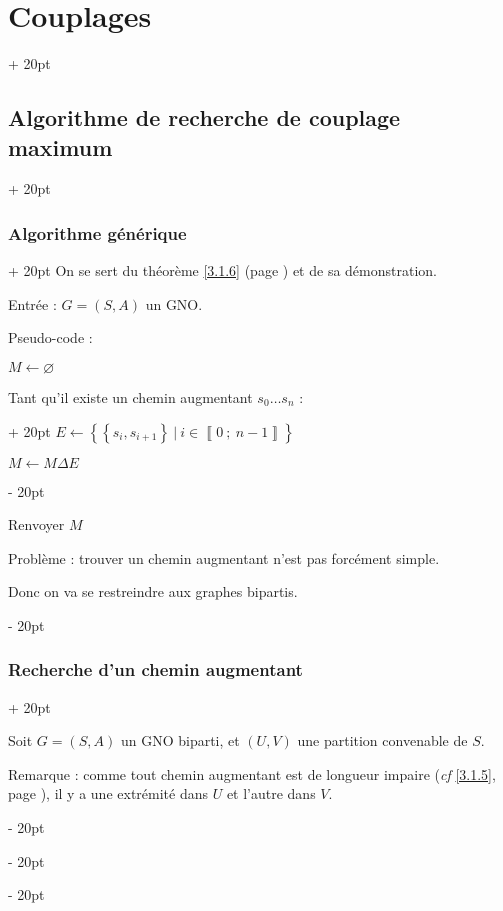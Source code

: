 \documentclass[a4paper, 12pt, twoside]{article}
\newcommand{\nset}[2]{\left\llbracket #1\ ;\ #2 \right\rrbracket}
\newcommand{\set}[1]{\left\{ #1 \right\}}
\newcommand{\ind}[1][20pt]{\advance\leftskip + #1}
\newcommand{\deind}[1][20pt]{\advance\leftskip - #1}
\newenvironment{indt}[2][20pt]{#2 \par \ind[#1]}{\par \deind} %
\begin{document}
\begin{indt}{\section{Couplages}}
        \begin{indt}{\subsection{Algorithme de recherche de couplage maximum}}
            \begin{indt}{\subsubsection{Algorithme générique}}
                On se sert du théorème \ref{3.1.6} (page \pageref{3.1.6}) et de sa démonstration.

                Entrée : $G = (S, A)$ un GNO.

                Pseudo-code :

                \begin{pseudocode}
                    $M \leftarrow \varnothing$

                    \begin{indt}{Tant qu'il existe un chemin augmentant $s_0 \ldots s_n$ :}
                        $E \leftarrow \set{\set{s_i, s_{i + 1}}\ |\ i \in \nset 0 {n - 1}}$

                        $M \leftarrow M \Delta E$
                    \end{indt}

                    Renvoyer $M$
                \end{pseudocode}

                Problème : trouver un chemin augmentant n'est pas forcément simple.

                Donc on va se restreindre aux graphes bipartis.
            \end{indt}

            \vspace{12pt}
            
            \begin{indt}{\subsubsection{Recherche d'un chemin augmentant}}
                \label{3.2.2}

                Soit $G = (S ,A)$ un GNO biparti, et $(U, V)$ une partition convenable de $S$.

                \vspace{12pt}
                
                Remarque : comme tout chemin augmentant est de longueur impaire (\textit{cf} \ref{3.1.5}, page \pageref{3.1.5}), il y a une extrémité dans $U$ et l'autre dans $V$.


\end{indt}
\end{indt}
\end{indt}
\end{document}

